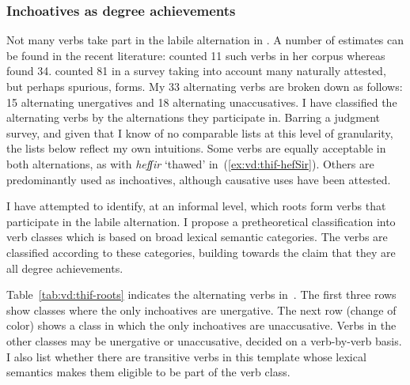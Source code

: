 		\subsubsection{Inchoatives as degree achievements} \label{vd:thif:inch:roots}
Not many verbs take part in the labile alternation in {\thit}. A number of estimates can be found in the recent literature: \cite{arad05} counted 11 such verbs in her corpus whereas \cite{laks11} found 34. \cite{lev16} counted 81 in a survey taking into account many naturally attested, but perhaps spurious, forms. My 33 alternating verbs are broken down as follows: 15 alternating unergatives and 18 alternating unaccusatives. I have classified the alternating verbs by the alternations they participate in. Barring a judgment survey, and given that I know of no comparable lists at this level of granularity, the lists below reflect my own intuitions. Some verbs are equally acceptable in both alternations, as with \emph{hefʃir} `thawed' in~(\ref{ex:vd:thif-hefSir}). Others are predominantly used as inchoatives, although causative uses have been attested.

I have attempted to identify, at an informal level, which roots form verbs that participate in the labile alternation. I propose a pretheoretical classification into verb classes which is based on broad lexical semantic categories. The verbs are classified according to these categories, building towards the claim that they are all degree achievements.

Table~\ref{tab:vd:thif-roots} indicates the alternating verbs in~{\thif}. The first three rows show classes where the only inchoatives are unergative. The next row (change of color) shows a class in which the only inchoatives are unaccusative. Verbs in the other classes may be unergative or unaccusative, decided on a verb-by-verb basis. I also list whether there are transitive verbs in this template whose lexical semantics makes them eligible to be part of the verb class.


